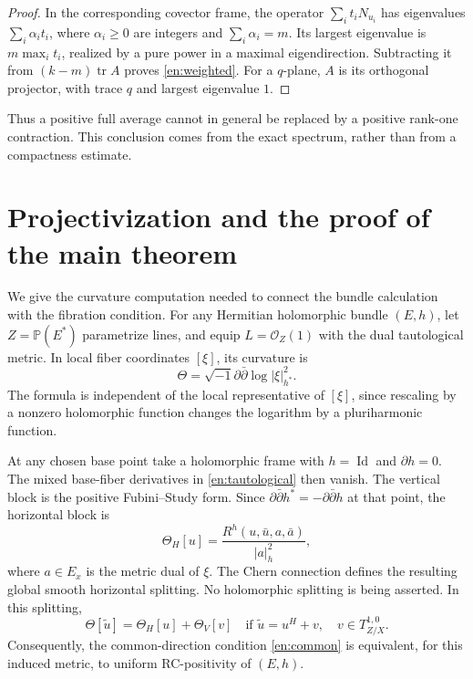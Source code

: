 \documentclass[12pt]{amsart}
\theoremstyle{definition}
\theoremstyle{remark}
\numberwithin{equation}{section}
\DeclareMathOperator{\tr}{tr}
\DeclareMathOperator{\Id}{Id}
\newcommand{\Pp}{\mathbb P}
\newcommand{\ddc}{\sqrt{-1}\partial\bar\partial}
\newcommand{\eref}[1]{\eqref{en:#1}}
\begin{document}
\begin{proof}
In the corresponding covector frame, the operator $\sum_i t_iN_{u_i}$ has eigenvalues $\sum_i\alpha_i t_i$, where $\alpha_i\ge0$ are integers and $\sum_i\alpha_i=m$. Its largest eigenvalue is $m\max_i t_i$, realized by a pure power in a maximal eigendirection. Subtracting it from $(k-m)\tr A$ proves \eref{weighted}. For a $q$-plane, $A$ is its orthogonal projector, with trace $q$ and largest eigenvalue $1$.
\end{proof}

Thus a positive full average cannot in general be replaced by a positive rank-one contraction. This conclusion comes from the exact spectrum, rather than from a compactness estimate.

\section{Projectivization and the proof of the main theorem}

We give the curvature computation needed to connect the bundle calculation with the fibration condition. For any Hermitian holomorphic bundle $(E,h)$, let $Z=\Pp(E^*)$ parametrize lines, and equip $L=\mathcal O_Z(1)$ with the dual tautological metric. In local fiber coordinates $[\xi]$, its curvature is
\begin{equation}\label{en:tautological}
\Theta=\ddc\log|\xi|_{h^*}^2.
\end{equation}
The formula is independent of the local representative of $[\xi]$, since rescaling by a nonzero holomorphic function changes the logarithm by a pluriharmonic function.

At any chosen base point take a holomorphic frame with $h=\Id$ and $\partial h=0$. The mixed base-fiber derivatives in \eref{tautological} then vanish. The vertical block is the positive Fubini--Study form. Since $\partial\bar\partial h^*=-\partial\bar\partial h$ at that point, the horizontal block is
\begin{equation}\label{en:horizontal}
\Theta_H[u]=\frac{R^h(u,\bar u,a,\bar a)}{|a|_h^2},
\end{equation}
where $a\in E_x$ is the metric dual of $\xi$. The Chern connection defines the resulting global smooth horizontal splitting. No holomorphic splitting is being asserted. In this splitting,
\begin{equation}\label{en:lifts}
\Theta[\widetilde u]=\Theta_H[u]+\Theta_V[v]
\quad\text{if }\widetilde u=u^H+v,\quad v\in T^{1,0}_{Z/X}.
\end{equation}
Consequently, the common-direction condition \eref{common} is equivalent, for this induced metric, to uniform RC-positivity of $(E,h)$.
\end{document}
